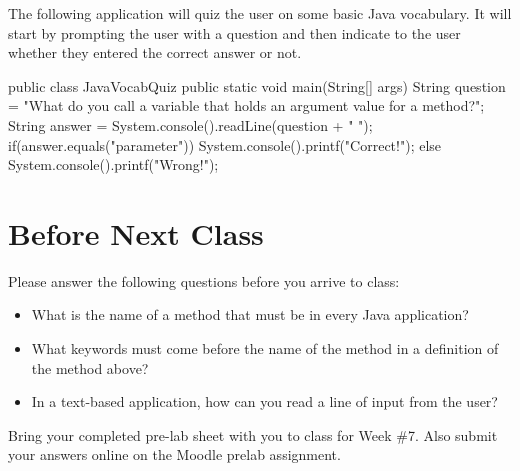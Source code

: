 \begin{exa}
The following application will quiz the user on some basic Java vocabulary. It will start by prompting the user with a question and then indicate to the user whether they entered the correct answer or not.


\begin{code}
public class JavaVocabQuiz {
  public static void main(String[] args) {
    String question = "What do you call a variable that holds an argument value for a method?";
    String answer = System.console().readLine(question + " ");
    if(answer.equals("parameter")) {
      System.console().printf("Correct!\n");
    } else {
      System.console().printf("Wrong!\n");
    }
  }
}
\end{code}

\end{exa}


\newpage

\section{Before Next Class}

Please answer the following questions before you arrive to class:

\begin{exer}

\begin{itemize}

\item What is the name of a method that must be in every Java application? 

  \evalline
  
\item What keywords must come before the name of the method in a definition of the method above? 

  \evalline
  
\item In a text-based application, how can you read a line of input from the user?

  \evalline
  
\end{itemize}

\end{exer}

Bring your completed pre-lab sheet with you to class for Week \#7. Also submit your answers online on the Moodle prelab assignment.  

